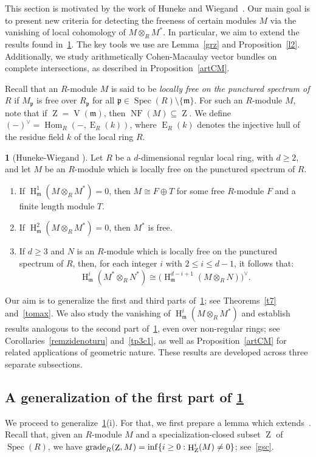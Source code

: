\documentclass[11pt]{amsart}
\theoremstyle{definition}
\theoremstyle{definition}
\newtheorem{chunk}[thm]{\hspace*{-1.065ex}\bf}
\numberwithin{equation}{section}
\newcommand{\fm}{\mathfrak{m}}
\newcommand{\fp}{\mathfrak{p}}
\DeclareMathOperator{\gr}{\textnormal{grade}}
\DeclareMathOperator{\V}{V}
\DeclareMathOperator{\mz}{Z}
\DeclareMathOperator{\hh}{H}
\DeclareMathOperator{\E}{E}
\DeclareMathOperator{\Hom}{Hom}
\DeclareMathOperator{\Spec}{Spec}
\DeclareMathOperator{\NF}{NF}
\begin{document}
This section is motivated by the work of Huneke and Wiegand~\cite{HW2}. Our main goal is to present new criteria for detecting the freeness of certain modules $M$ via the vanishing of local cohomology of $M \otimes_R M^\ast$. In particular, we aim to extend the results found in~\ref{HWL1}. The key tools we use are Lemma~\ref{grz} and Proposition~\ref{l2}. Additionally, we study arithmetically Cohen-Macaulay vector bundles on complete intersections, as described in Proposition~\ref{artCM}.

Recall that an $R$-module $M$ is said to be \emph{locally free on the punctured spectrum of $R$} if $M_{\fp}$ is free over $R_{\fp}$ for all $\fp \in \Spec(R) \setminus \{\fm\}$. For such an $R$-module $M$, note that if $\mz = \V(\fm)$, then $\NF(M) \subseteq \mz$. We define $(-)^{\vee} = \Hom_R\left(-, \E_R(k)\right)$, where $\E_R(k)$ denotes the injective hull of the residue field $k$ of the local ring $R$.

\begin{chunk} [{Huneke-Wiegand \cite[4.1 and 4.2]{HW2}}] \label{HWL1} \label{HWL3} Let $R$ be a $d$-dimensional regular local ring, with $d\geq 2$, and let $M$ be an $R$-module which is locally free on the punctured spectrum of $R$.
\begin{enumerate}[\rm(i)]
\item If $\hh^1_{\fm}(M\otimes_RM^*)=0$, then $M \cong F\oplus T$ for some free $R$-module $F$ and a finite length module $T$.
\item If $\hh^2_{\fm}(M\otimes_RM^*)=0$, then $M^{\ast}$ is free.
\item If $d\geq 3$ and $N$ is an $R$-module which is locally free on the punctured spectrum of $R$, then,  for each integer $i$ with $2 \leq i \leq d-1$, it follows that: $$\hh_{\fm}^i(M^\ast\otimes_RN^\ast)\cong \big(\hh_{\fm}^{d-i+1}(M \otimes_RN )\big)^{\vee}.$$
\end{enumerate}
\end{chunk}

Our aim is to generalize the first and third parts of~\ref{HWL1}; see Theorems~\ref{t7} and~\ref{tomax}. We also study the vanishing of $\hh^i_{\fm}(M \otimes_R M^*)$ and establish results analogous to the second part of~\ref{HWL1}, even over non-regular rings; see Corollaries~\ref{remzidenoturu} and~\ref{tp3c1}, as well as Proposition~\ref{artCM} for related applications of geometric nature. These results are developed across three separate subsections.

\subsection*{A generalization of the first part of \ref{HWL1}} We proceed to generalize~\ref{HWL1}(i). For that, we first prepare a lemma which extends~\cite[1.4.19]{BH}.  Recall that, given an $R$-module $M$ and a specialization-closed subset $\mz$ of $\Spec(R)$, we have $\gr_R(\mz,M)=\inf\{i \geq 0 : \hh_{\mz}^{i}(M)\neq0\}$; see~\ref{gsc}.
\end{document}
